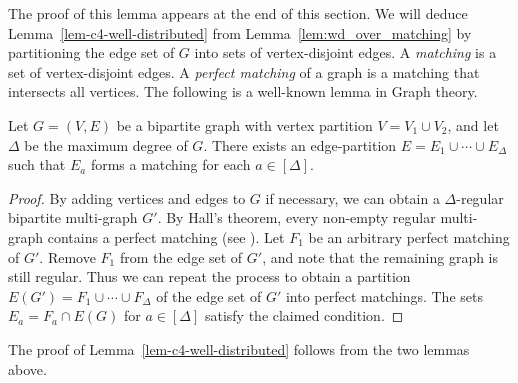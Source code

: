 The proof of this lemma appears at the end of this section.
We will deduce Lemma~\ref{lem-c4-well-distributed} from Lemma~\ref{lem:wd_over_matching}
by partitioning the edge set of $G$ into sets of vertex-disjoint edges.
A {\em matching} is a set of vertex-disjoint edges.
A {\em perfect matching} of a graph is a matching that intersects all vertices.
The following is a well-known lemma in Graph theory.

\begin{lemma} \label{lem:decompose}
Let $G = (V, E)$ be a bipartite graph with vertex partition $V = V_1 \cup V_2$, and
let $\Delta$ be the maximum degree of $G$. 
There exists an edge-partition $E = E_1 \cup \cdots \cup E_\Delta$ such that $E_a$ forms a matching
for each $a \in [\Delta]$.
\end{lemma}
\begin{proof}
By adding vertices and edges to $G$ if necessary, we can obtain a $\Delta$-regular 
bipartite multi-graph $G'$.
By Hall's theorem, every non-empty
regular multi-graph contains a perfect matching (see \cite[Corollary 2.1.3]{Diestel}). 
Let $F_1$ be an arbitrary perfect matching of $G'$. Remove $F_1$ from the edge set of $G'$, 
and note that the remaining graph is still regular. Thus we can repeat the process to 
obtain a partition $E(G') = F_1 \cup \cdots \cup F_{\Delta}$ of the edge set of $G'$ into perfect 
matchings. 
The sets $E_a = F_a \cap E(G)$ for $a \in [\Delta]$ satisfy the claimed condition.
\end{proof}

The proof of Lemma~\ref{lem-c4-well-distributed} follows from the two lemmas above.

